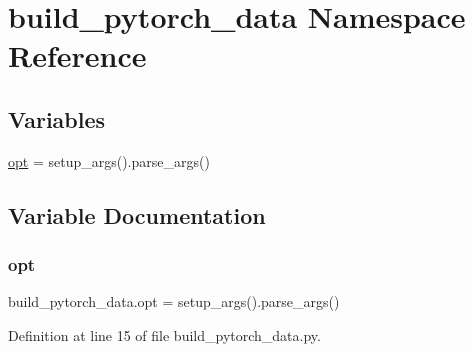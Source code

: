 \hypertarget{namespacebuild__pytorch__data}{}\section{build\+\_\+pytorch\+\_\+data Namespace Reference}
\label{namespacebuild__pytorch__data}
\subsection*{Variables}
\begin{DoxyCompactItemize}
\item 
\hyperlink{namespacebuild__pytorch__data_a2fd757855fdcf2e90fd5b713480bf494}{opt} = setup\+\_\+args().parse\+\_\+args()
\end{DoxyCompactItemize}


\subsection{Variable Documentation}
\mbox{\label{namespacebuild__pytorch__data_a2fd757855fdcf2e90fd5b713480bf494}} 
\subsubsection{\texorpdfstring{opt}{opt}}
{\footnotesize\ttfamily build\+\_\+pytorch\+\_\+data.\+opt = setup\+\_\+args().parse\+\_\+args()}



Definition at line 15 of file build\+\_\+pytorch\+\_\+data.\+py.

